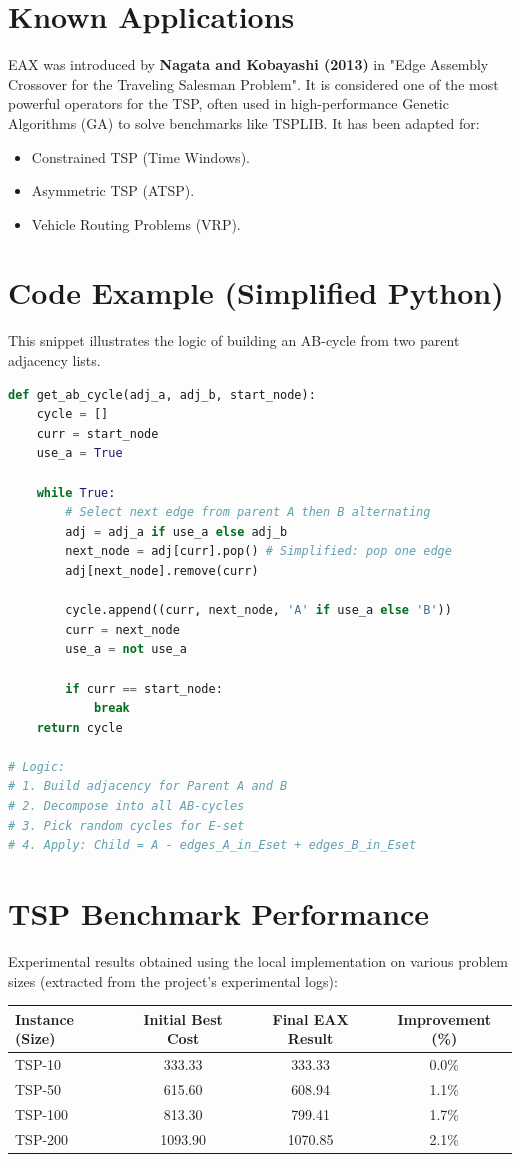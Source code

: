 \documentclass{article}
\begin{document}
\section{Known Applications}
EAX was introduced by \textbf{Nagata and Kobayashi (2013)} in "Edge Assembly Crossover for the Traveling Salesman Problem". It is considered one of the most powerful operators for the TSP, often used in high-performance Genetic Algorithms (GA) to solve benchmarks like TSPLIB. It has been adapted for:
\begin{itemize}
    \item Constrained TSP (Time Windows).
    \item Asymmetric TSP (ATSP).
    \item Vehicle Routing Problems (VRP).
\end{itemize}

\section{Code Example (Simplified Python)}
This snippet illustrates the logic of building an AB-cycle from two parent adjacency lists.

\begin{lstlisting}[language=Python]
def get_ab_cycle(adj_a, adj_b, start_node):
    cycle = []
    curr = start_node
    use_a = True
    
    while True:
        # Select next edge from parent A then B alternating
        adj = adj_a if use_a else adj_b
        next_node = adj[curr].pop() # Simplified: pop one edge
        adj[next_node].remove(curr)
        
        cycle.append((curr, next_node, 'A' if use_a else 'B'))
        curr = next_node
        use_a = not use_a
        
        if curr == start_node:
            break
    return cycle

# Logic: 
# 1. Build adjacency for Parent A and B
# 2. Decompose into all AB-cycles
# 3. Pick random cycles for E-set
# 4. Apply: Child = A - edges_A_in_Eset + edges_B_in_Eset
\end{lstlisting}

\section{TSP Benchmark Performance}
Experimental results obtained using the local implementation on various problem sizes (extracted from the project's experimental logs):

\begin{center}
\begin{tabular}{|l|c|c|c|}
\hline
\textbf{Instance (Size)} & \textbf{Initial Best Cost} & \textbf{Final EAX Result} & \textbf{Improvement (\%)} \\
\hline
TSP-10  & 333.33  & 333.33  & 0.0\% \\
TSP-50  & 615.60  & 608.94  & 1.1\% \\
TSP-100 & 813.30  & 799.41  & 1.7\% \\
TSP-200 & 1093.90 & 1070.85 & 2.1\% \\
\hline
\end{tabular}
\end{center}
\end{document}
